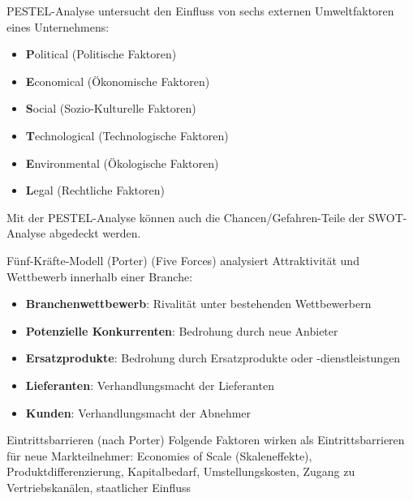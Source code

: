 \begin{minipage}{0.38\linewidth}


\begin{definition}{PESTEL-Analyse} untersucht den Einfluss von sechs externen Umweltfaktoren eines Unternehmens:
\begin{itemize}
    \item \textbf{P}olitical (Politische Faktoren)
    \item \textbf{E}conomical (Ökonomische Faktoren)
    \item \textbf{S}ocial (Sozio-Kulturelle Faktoren)
    \item \textbf{T}echnological (Technologische Faktoren)
    \item \textbf{E}nvironmental (Ökologische Faktoren)
    \item \textbf{L}egal (Rechtliche Faktoren)
\end{itemize}
\small
Mit der PESTEL-Analyse können auch die Chancen/Gefahren-Teile der SWOT-Analyse abgedeckt werden.
\end{definition}
\end{minipage}
\begin{minipage}{0.62\linewidth}
\begin{definition}{Fünf-Kräfte-Modell (Porter)} (Five Forces) 
    analysiert Attraktivität und Wettbewerb innerhalb einer Branche:
\begin{itemize}
    \item \textbf{Branchenwettbewerb}: Rivalität unter bestehenden Wettbewerbern
    \item \textbf{Potenzielle Konkurrenten}: Bedrohung durch neue Anbieter
    \item \textbf{Ersatzprodukte}: Bedrohung durch Ersatzprodukte oder -dienstleistungen
    \item \textbf{Lieferanten}: Verhandlungsmacht der Lieferanten
    \item \textbf{Kunden}: Verhandlungsmacht der Abnehmer
\end{itemize}
\end{definition}

\begin{concept}{Eintrittsbarrieren (nach Porter)}
Folgende Faktoren wirken als Eintrittsbarrieren für neue Markteilnehmer:
Economies of Scale (Skaleneffekte), Produktdifferenzierung, Kapitalbedarf, Umstellungskosten, Zugang zu Vertriebskanälen, staatlicher Einfluss
\end{concept}
\end{minipage}

